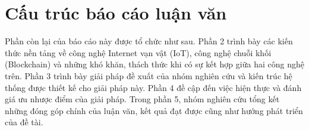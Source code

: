 \section{Cấu trúc báo cáo luận văn}
Phần còn lại của báo cáo này được tổ chức như sau. Phần 2 trình bày các kiến thức nền tảng về công nghệ Internet vạn vật (IoT), công nghệ chuỗi khối (Blockchain) và những khó khăn, thách thức khi có sự kết hợp giữa hai công nghệ trên. Phần 3 trình bày giải pháp đề xuất của nhóm nghiên cứu và kiến trúc hệ thống được thiết kế cho giải pháp này. Phần 4 đề cập đến việc hiện thực và đánh giá ưu nhược điểm của giải pháp. Trong phần 5, nhóm nghiên cứu tổng kết những đóng góp chính của luận văn, kết quả đạt được cũng như hướng phát triển của đề tài. 

